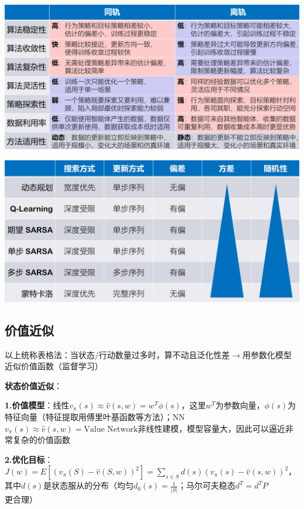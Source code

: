 	\begin{figurehere}
		\centering
		\includegraphics[width=1\linewidth]{image13}
		\label{fig:image13}
	\end{figurehere}
	\begin{figurehere}
		\centering
		\includegraphics[width=1\linewidth]{image14}
		\label{fig:image14}
	\end{figurehere}
	
	\subsection*{价值近似}
	以上统称表格法：当状态/行动数量过多时，算不动且泛化性差$\rightarrow$用参数化模型近似价值函数（监督学习）
	
	\textbf{状态价值近似}：
	
	\textbf{1.价值模型}：线性$v_\pi(s)\approx\hat{v}(s, w)=w^T\phi(s)$，这里$w^T$为参数向量，$\phi(s)$为特征向量（特征提取用傅里叶基函数等方法）；NN$v_\pi(s)\approx\hat{v}(s, w)=\text{Value Network}$非线性建模，模型容量大，因此可以逼近非常复杂的价值函数
	
	\textbf{2.优化目标}：$J(w)=E\left[\left(v_{\pi}(S)-\hat{v}(S, w)\right)^2\right]=\sum_{s\in S} d(s)\left(v_{\pi}(s)-\hat{v}(s, w)\right)^2$，其中$d(s)$是状态服从的分布（均匀$d_0(s)=\frac{1}{|S|}$；马尔可夫稳态$d^T=d^T P$更合理）
	
